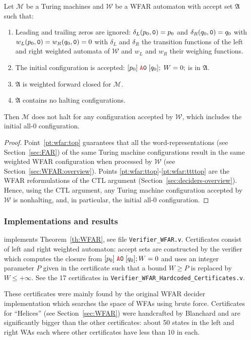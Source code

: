 \begin{theorem}\label{th:WFAR}
    Let $\mathcal{M}$ be a Turing machines and $\mathcal{W}$ be a WFAR automaton with accept set $\mathfrak{A}$ such that:
    \begin{enumerate}
        \item Leading and trailing zeros are ignored: $\delta_L(p_0,\texttt{0}) = p_0$ and $\delta_R(q_0,\texttt{0}) = q_0$ with $w_L(p_0,\texttt{0}) = w_R(q_0,\texttt{0}) = 0$ with $\delta_L$ and $\delta_R$ the transition functions of the left and right weighted automata of $\mathcal{W}$ and $w_L$ and $w_R$ their weighing functions.\label{pt:wfar:top}
        \item The initial configuration is accepted: \ie $[p_0]\; \texttt{\stateA}\szero\; [q_0];\; W=0;$ is in $\mathfrak{A}$.\label{pt:wfar:ttop}
        \item $\mathfrak{A}$ is weighted forward closed for $\mathcal{M}$.\label{pt:wfar:tttop}
        \item $\mathfrak{A}$ contains no halting configurations.\label{pt:wfar:ttttop}
    \end{enumerate}

    Then $\mathcal{M}$ does not halt for any configuration accepted by $\mathcal{W}$, which includes the initial all-0 configuration.
\end{theorem}
\begin{proof}
    Point~\ref{pt:wfar:top} guarantees that all the word-representations (see Section~\ref{sec:FAR}) of the same Turing machine configurations result in the same weighted WFAR configuration when processed by $\mathcal{W}$ (see Section~\ref{sec:WFAR:overview}). Points \ref{pt:wfar:ttop}-\ref{pt:wfar:ttttop} are the WFAR reformulations of the CTL argument (Section~\ref{sec:deciders-overview}). Hence, using the CTL argument, any Turing machine configuration accepted by $\mathcal{W}$ is nonhalting, and, in particular, the initial all-0 configuration.
\end{proof}





\subsubsection{Implementations and results}\label{sec:WFAR:results}

\CoqBB implements Theorem~\ref{th:WFAR}, see file \texttt{Verifier\_WFAR.v}. Certificates consist of left and right weighted automaton: accept sets are constructed by the \Coq verifier which computes the closure from $[p_0]\; \texttt{\stateA} \szero\; [q_0]; W=0$ and uses an integer parameter $P$ given in the certificate such that a bound $W \geq P$ is replaced by $W \leq +\infty$. See the 17 certificates in \texttt{Verifier\_WFAR\_Hardcoded\_Certificates.v}.

These certificates were mainly found by the original WFAR decider implementation \cite{iijil1_2025_14914502} which searches the space of WFAs using brute force. Certificates for ``Helices'' (see Section~\ref{sec:WFAR}) were handcrafted by Blanchard and are significantly bigger than the other certificates: about 50 states in the left and right WAs each where other certificates have less than 10 in each.